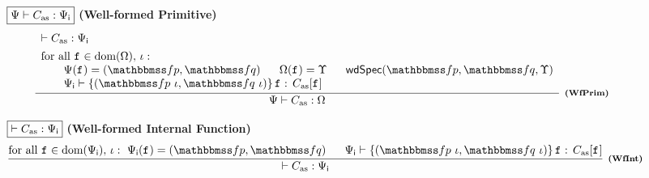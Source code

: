 \begin{figure*}[!t]
    \centering
    \subfigure
    {
        \begin{minipage}{1\linewidth}
            $\boxed{{\Psi} \vdash {C_{\text{as}}} : {\Psi_{\textsf{i}}}}$ \quad\quad
            \textbf{(Well-formed Primitive)}
            \[
				\infer[\tinybftext{(WfPrim)}]
				{
					\wfprim{\Cspec}{\asmimp}{\hprimset}
				}
				{
                    \begin{array}{l}
                        \wfcdhp{\asmimp}{\intSpec} \\
                        \\[-8pt]
                        \TYPE{for all } \lab{} \in \dom(\hprimset), \, 
                        	\lgvl: \\
                        \qquad
                        \Cspec(\lab{}) = (\relspecpre, \relspecpost)
                        \quad \ \ 
                        \hprimset(\lab{}) = \hprim \quad \ \ 
                        \wdSpec{\relspecpre}{\relspecpost}
                        	{\hprim} 
                        \\
                        \qquad
                        \wdcblk{\intSpec}{\relspecpre \ \lgvl}
                            {\relspecpost \ \lgvl}{\lab{}}{\asmimp[\lab{}]}
                    \end{array}
				}
			\]
		\end{minipage}
    }

    \subfigure
    {
        \begin{minipage}{1\textwidth}
            $\boxed{\vdash {C_{\text{as}}} : {\Psi_{\textsf{i}}}}$ \qquad
            \textbf{(Well-formed Internal Function)}
            \[
                \infer[\tinybftext{(WfInt)}]
                {
                    \wfcdhp{\asmimp}{\intSpec}
                }
                {
                    \TYPE{for all } \lab{} \in \dom(\intSpec), \, 
                    \lgvl : \ 
                    \intSpec(\lab{}) = (\relspecpre, \relspecpost) 
                    \quad \ \ 
                    \wdcblk{\intSpec}{\relspecpre \ \lgvl}
                        {\relspecpost \ \lgvl}{\lab{}}
                        {\asmimp[\lab{}]}
                }
            \]
        \end{minipage}
    }


\end{figure*}
